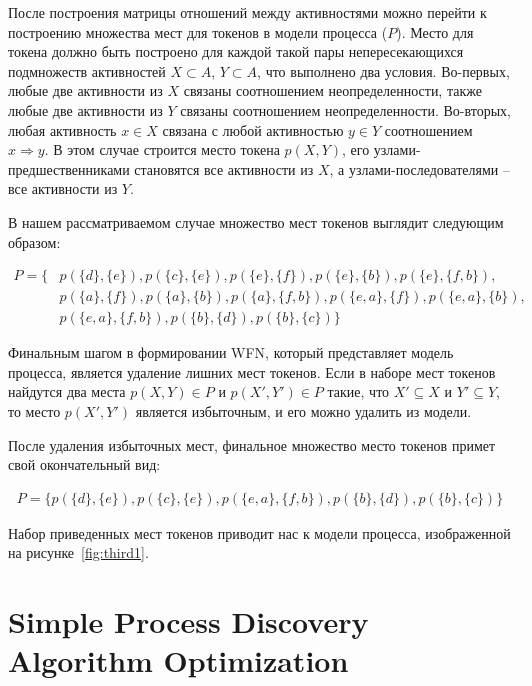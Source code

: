 \documentclass[
11pt,%
tightenlines,%
twoside,%
onecolumn,%
nofloats,%
nobibnotes,%
nofootinbib,%
superscriptaddress,%
noshowpacs,%
centertags]%
{revtex4}
\begin{document}
После построения матрицы отношений между активностями можно перейти к построению множества мест для токенов в модели процесса ($P$).
Место для токена должно быть построено для каждой такой пары непересекающихся подмножеств активностей $X \subset A$, $Y \subset A$, что выполнено два условия.
Во-первых, любые две активности из $X$ связаны соотношением неопределенности, также любые две активности из $Y$ связаны соотношением неопределенности.
Во-вторых, любая активность $x \in X$ связана с любой активностью $y \in Y$ соотношением $x \Rightarrow y$. 
В этом случае строится место токена $p(X, Y)$, его узлами-предшественниками становятся все активности из $X$, а узлами-последователями -- все активности из $Y$.

В нашем рассматриваемом случае множество мест токенов выглядит следующим образом:

\begin{equation}
\begin{aligned}
P = \{
& p(\{d\}, \{e\}),
p(\{c\}, \{e\}),
p(\{e\}, \{f\}),
p(\{e\}, \{b\}),
p(\{e\}, \{f, b\}), \\
& p(\{a\}, \{f\}),
p(\{a\}, \{b\}),
p(\{a\}, \{f, b\}),
p(\{e, a\}, \{f\}),
p(\{e, a\}, \{b\}), \\
& p(\{e, a\}, \{f, b\}),
p(\{b\}, \{d\}),
p(\{b\}, \{c\})
\}
\end{aligned}
\end{equation}

Финальным шагом в формировании WFN, который представляет модель процесса, является удаление лишних мест токенов.
Если в наборе мест токенов найдутся два места $p(X, Y) \in P$ и $p(X', Y') \in P$ такие, что $X' \subseteq X$ и $Y' \subseteq Y$, то место $p(X', Y')$ является избыточным, и его можно удалить из модели.

После удаления избыточных мест, финальное множество место токенов примет свой окончательный вид:

\begin{equation}
\begin{aligned}
P = \{
p(\{d\}, \{e\}), p(\{c\}, \{e\}), p(\{e, a\}, \{f, b\}), p(\{b\}, \{d\}), p(\{b\}, \{c\})
\}
\end{aligned}
\end{equation}

Набор приведенных мест токенов приводит нас к модели процесса, изображенной на рисунке~\ref{fig:third1}.

\section{Simple Process Discovery Algorithm Optimization}
\end{document}
